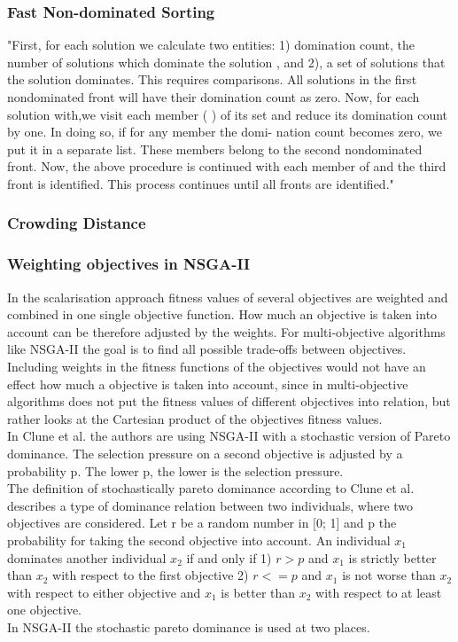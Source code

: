     \subsubsection{Fast Non-dominated Sorting}
    \label{sec:sorting}
    "First, for each solution we calculate two entities: 1) domination count, the number of solutions which dominate the solution , and 2), a set of solutions that the solution dominates. This requires comparisons. All solutions in the first nondominated front will have their domination count as zero. Now, for each solution with,we visit each member ( ) of its set and reduce its domination count by one. In doing so, if for any member the domi- nation count becomes zero, we put it in a separate list. These members belong to the second nondominated front. Now, the above procedure is continued with each member of and the third front is identified. This process continues until all fronts are identified."
    
    \subsubsection{Crowding Distance}
    \label{sec:crowdingDistance}
    
    \subsubsection{Weighting objectives in NSGA-II}
    In the scalarisation approach fitness values of several objectives are weighted and combined in one single objective function. How much an objective is taken into account can be therefore adjusted by the weights. For multi-objective algorithms like NSGA-II the goal is to find all possible trade-offs between objectives. Including weights in the fitness functions of the objectives would not have an effect how much a objective is taken into account, since in multi-objective algorithms does not put the fitness values of different objectives into relation, but rather looks at the Cartesian product of the objectives fitness values.\\
    In Clune et al.\cite{clune2013evolutionary} the authors are using NSGA-II with a stochastic version of Pareto dominance. The selection pressure on a second objective is adjusted by a probability p. The lower p, the lower is the selection pressure.\\
    The definition of stochastically pareto dominance according to Clune et al.\cite{clune2013evolutionary} describes a type of dominance relation between two individuals, where two objectives are considered. Let r be a random number in [0; 1] and p the probability for taking the second objective into account. An individual $x_1$ dominates another individual $x_2$ if and only if 1) $r>p$ and $x_1$ is strictly better than $x_2$ with respect to the first objective 2) $r<=p$ and $x_1$ is not worse than $x_2$ with respect to either objective and $x_1$ is better than $x_2$ with respect to at least one objective.\\
    In NSGA-II the stochastic pareto dominance is used at two places. 
    
